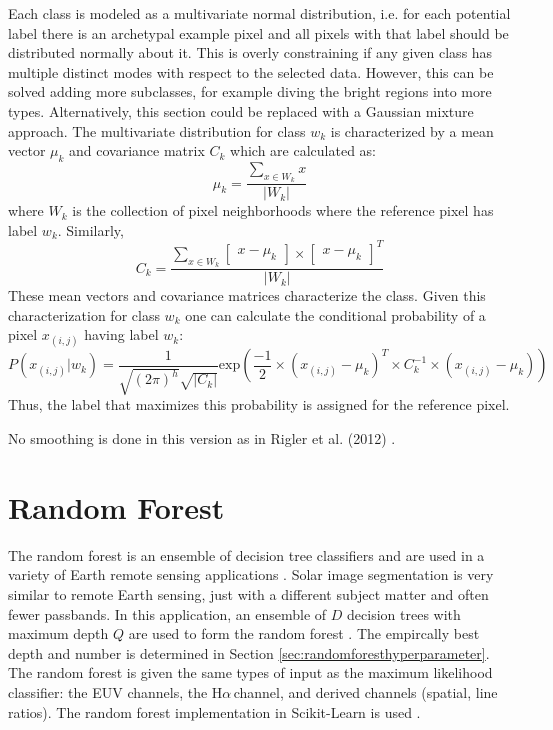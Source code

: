 \documentclass[twoside]{report}
\newcommand{\halpha}{H$\alpha$\,}
\newcommand{\todo}[1]{{\color{red}{\textbf{#1}}}}
\begin{document}
Each class is modeled as a multivariate normal distribution, i.e. for each potential label there is an archetypal example pixel and all pixels with that label should be distributed normally about it. This is overly constraining if any given class has multiple distinct modes with respect to the selected data. However, this can be solved adding more subclasses, for example diving the bright regions into more types. Alternatively, this section could be replaced with a Gaussian mixture approach. The multivariate distribution for class $w_k$ is characterized by a mean vector $\mu_k$ and covariance matrix $C_k$ which are calculated as:
\[ \mu_k = \frac{\sum_{x \in W_k} x}{|W_k|} \]
where $W_k$ is the collection of pixel neighborhoods where the reference pixel has label $w_k$. Similarly,
\[ C_k = \frac{\sum_{x \in W_k} \begin{bmatrix} x - \mu_k \end{bmatrix} \times \begin{bmatrix} x - \mu_k \end{bmatrix}^T}{|W_k|} \]
These mean vectors and covariance matrices characterize the class. Given this characterization for class $w_k$ one can calculate the conditional probability of a pixel $x_{(i,j)}$ having label $w_k$:
\[ P(x_{(i,j)} | w_k) = \frac{1}{\sqrt{(2 \pi)^h} \sqrt{|C_k|}} \mathrm{exp} \left( \frac{-1}{2} \times \left(x_{(i,j)} - \mu_k \right)^T \times C_k^{-1} \times \left(x_{(i,j)} - \mu_k \right) \right) \]
Thus, the label that maximizes this probability is assigned for the reference pixel.

No smoothing is done in this version as in Rigler et al. (2012) \cite{rigler:2012}. 

\section{Random Forest}
The random forest is an ensemble of decision tree classifiers and are used in a variety of Earth remote sensing applications \cite{puissant2014object, salas2016multispectral, clark2016mapping, kulkarni2017multispectral, lowe:2015}. Solar image segmentation is very similar to remote Earth sensing, just with a different subject matter and often fewer passbands. In this application, an ensemble of $D$ decision trees with maximum depth $Q$ are used to form the random forest \todo{change to optimal}. The empircally best depth and number is determined in Section \ref{sec:randomforesthyperparameter}. The random forest is given the same types of input as the maximum likelihood classifier: the EUV channels, the \halpha channel, and derived channels (spatial, line ratios). The random forest implementation in Scikit-Learn is used \cite{scikit-learn}. 
\end{document}
